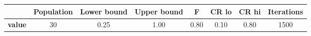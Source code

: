 \begin{tabular}{cccccccc}
\toprule
{} &  Population &  Lower bound &  Upper bound &    F &  CR lo &  CR hi &  Iterations \\
\midrule
\textbf{value} &          30 &         0.25 &         1.00 & 0.80 &   0.10 &   0.80 &        1500 \\
\bottomrule
\end{tabular}
